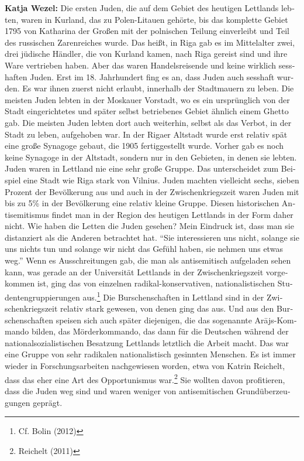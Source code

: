 \begin{otherlanguage}{ngerman}
\textbf{Katja Wezel:} Die ersten Juden, die auf dem Gebiet des heutigen Lettlands lebten, waren in Kurland, das zu Polen-Litauen gehörte, bis das komplette Gebiet 1795 von Katharina der Großen mit der polnischen Teilung einverleibt und Teil des russischen Zarenreiches wurde. Das heißt, in Riga gab es im Mittelalter zwei, drei jüdische Händler, die von Kurland kamen, nach Riga gereist sind und ihre Ware vertrieben haben. Aber das waren Handelsreisende und keine wirklich sesshaften Juden. Erst im 18. Jahrhundert fing es an, dass Juden auch sesshaft wurden. Es war ihnen zuerst nicht erlaubt, innerhalb der Stadtmauern zu leben. Die meisten Juden lebten in der Moskauer Vorstadt, wo es ein ursprünglich von der Stadt eingerichtetes und später selbst betriebenes Gebiet ähnlich einem Ghetto gab. Die meisten Juden lebten dort auch weiterhin, selbst als das Verbot, in der Stadt zu leben, aufgehoben war. In der Rigaer Altstadt wurde erst relativ spät eine große Synagoge gebaut, die 1905 fertiggestellt wurde. Vorher gab es noch keine Synagoge in der Altstadt, sondern nur in den Gebieten, in denen sie lebten. 
Juden waren in Lettland nie eine sehr große Gruppe. Das unterscheidet zum Beispiel eine Stadt wie Riga stark von Vilnius. Juden machten vielleicht sechs, sieben Prozent der Bevölkerung aus und auch in der Zwischenkriegszeit waren Juden mit bis zu 5\% in der Bevölkerung eine relativ kleine Gruppe. Diesen historischen Antisemitismus findet man in der Region des heutigen Lettlands in der Form daher nicht. 
Wie haben die Letten die Juden gesehen? Mein Eindruck ist, dass man sie distanziert als die Anderen betrachtet hat. ``Sie interessieren uns nicht, solange sie uns nichts tun und solange wir nicht das Gefühl haben, sie nehmen uns etwas weg.'' Wenn es Ausschreitungen gab, die man als antisemitisch aufgeladen sehen kann, was gerade an der Universität Lettlands in der Zwischenkriegszeit vorgekommen ist, ging das von einzelnen radikal-konservativen, nationalistischen Studentengruppierungen aus.\footnote{Cf. Bolin (2012)} Die Burschenschaften in Lettland sind in der Zwischenkriegszeit relativ stark gewesen, von denen ging das aus. Und aus den Burschenschaften speisen sich auch später diejenigen, die das sogenannte Arājs-Kommando bilden, das Mörderkommando, das dann für die Deutschen während der nationalsozialistischen Besatzung Lettlands letztlich die Arbeit macht. Das war eine Gruppe von sehr radikalen nationalistisch gesinnten Menschen. Es ist immer wieder in Forschungsarbeiten nachgewiesen worden, etwa von Katrin Reichelt, dass das eher eine Art des Opportunismus war.\footnote{Reichelt (2011)} Sie wollten davon profitieren, dass die Juden weg sind und waren weniger von antisemitischen Grundüberzeugungen geprägt. 


\end{otherlanguage}
